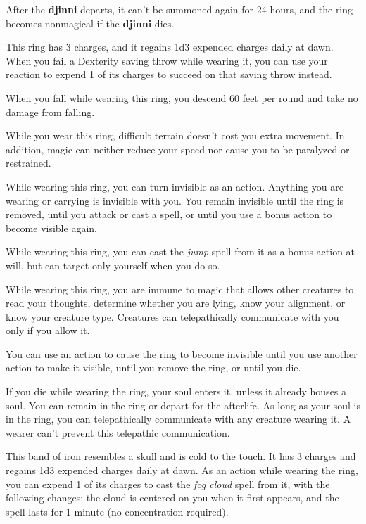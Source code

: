 \documentclass[10pt,a4paper,twoside,bg=print,twocolumn,openany,nodeprecatedcode]{dndbook}
\begin{document}
After the \textbf{djinni} departs, it can't be summoned again for 24 hours, and the ring becomes nonmagical if the \textbf{djinni} dies.

This ring has 3 charges, and it regains 1d3 expended charges daily at dawn. When you fail a Dexterity saving throw while wearing it, you can use your reaction to expend 1 of its charges to succeed on that saving throw instead.

When you fall while wearing this ring, you descend 60 feet per round and take no damage from falling.

While you wear this ring, difficult terrain doesn't cost you extra movement. In addition, magic can neither reduce your speed nor cause you to be paralyzed or restrained.

While wearing this ring, you can turn invisible as an action. Anything you are wearing or carrying is invisible with you. You remain invisible until the ring is removed, until you attack or cast a spell, or until you use a bonus action to become visible again.

While wearing this ring, you can cast the \textit{jump} spell from it as a bonus action at will, but can target only yourself when you do so.

While wearing this ring, you are immune to magic that allows other creatures to read your thoughts, determine whether you are lying, know your alignment, or know your creature type. Creatures can telepathically communicate with you only if you allow it.

You can use an action to cause the ring to become invisible until you use another action to make it visible, until you remove the ring, or until you die.

If you die while wearing the ring, your soul enters it, unless it already houses a soul. You can remain in the ring or depart for the afterlife. As long as your soul is in the ring, you can telepathically communicate with any creature wearing it. A wearer can't prevent this telepathic communication.

This band of iron resembles a skull and is cold to the touch. It has 3 charges and regains 1d3 expended charges daily at dawn. As an action while wearing the ring, you can expend 1 of its charges to cast the \textit{fog cloud} spell from it, with the following changes: the cloud is centered on you when it first appears, and the spell lasts for 1 minute (no concentration required).
\end{document}
